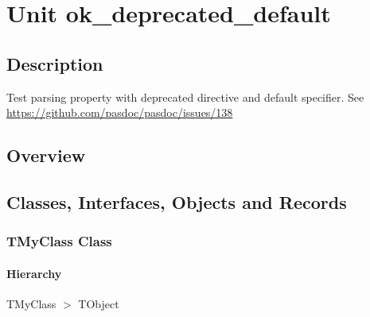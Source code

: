 \documentclass{report}
\newif\ifpdf
\begin{document}
\label{toc}\tableofcontents
\newpage
\newlength{\tmplength}
\chapter{Unit ok{\_}deprecated{\_}default}
\label{ok_deprecated_default}
\section{Description}
Test parsing property with deprecated directive and default specifier. See \href{https://github.com/pasdoc/pasdoc/issues/138}{https://github.com/pasdoc/pasdoc/issues/138}
\section{Overview}
\begin{description}
\item[\texttt{\begin{ttfamily}TMyClass\end{ttfamily} Class}]
\end{description}
\section{Classes, Interfaces, Objects and Records}
\ifpdf
\subsection*{\large{\textbf{TMyClass Class}}\normalsize\hspace{1ex}\hrulefill}
\else
\subsection*{TMyClass Class}
\fi
\label{ok_deprecated_default.TMyClass}
\subsubsection*{\large{\textbf{Hierarchy}}\normalsize\hspace{1ex}\hfill}
TMyClass {$>$} TObject
\end{document}
